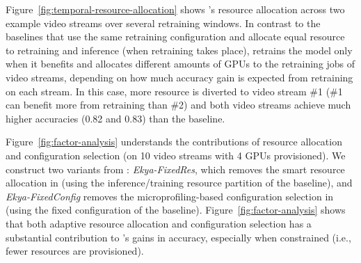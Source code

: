 
Figure~\ref{fig:temporal-resource-allocation} shows \name's resource allocation across two example video streams over several retraining windows. 
In contrast to the \fair baselines that use the same retraining configuration and allocate equal resource to retraining and inference (when retraining takes place), \name retrains the model only when it benefits and allocates different amounts of GPUs to the retraining jobs of video streams, depending on how much accuracy gain is expected from retraining on each stream. 
In this case, more resource is diverted to video stream \#1 (\#1 can benefit more from retraining than \#2) and both video streams achieve much higher accuracies (0.82 and 0.83) than the \fair baseline.

Figure~\ref{fig:factor-analysis} understands the contributions of resource allocation and configuration selection (on 10 video streams with 4 GPUs provisioned). 
We construct two variants from {\name}:
\emph{Ekya-FixedRes}, which removes the smart resource allocation in \name (\ie using the inference/training resource partition of the \fair baseline), 
and \emph{Ekya-FixedConfig} removes the microprofiling-based configuration selection in \name (\ie using the fixed configuration of the \fair baseline). 
Figure~\ref{fig:factor-analysis} shows that both adaptive resource allocation and configuration selection has a substantial contribution to \name{}'s gains in accuracy, especially when constrained (i.e., fewer resources are provisioned). 

